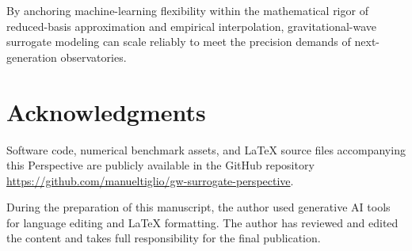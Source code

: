 \documentclass[11pt, a4paper]{article}
\begin{document}
By anchoring machine-learning flexibility within the mathematical rigor of reduced-basis approximation and empirical interpolation, gravitational-wave surrogate modeling can scale reliably to meet the precision demands of next-generation observatories.

\section*{Acknowledgments}
Software code, numerical benchmark assets, and LaTeX source files accompanying this Perspective are publicly available in the GitHub repository \\ 
\url{https://github.com/manueltiglio/gw-surrogate-perspective}.

During the preparation of this manuscript, the author used generative AI tools for language editing and  LaTeX formatting. The author has reviewed and edited the content and takes full responsibility for the final publication. 
\end{document}
